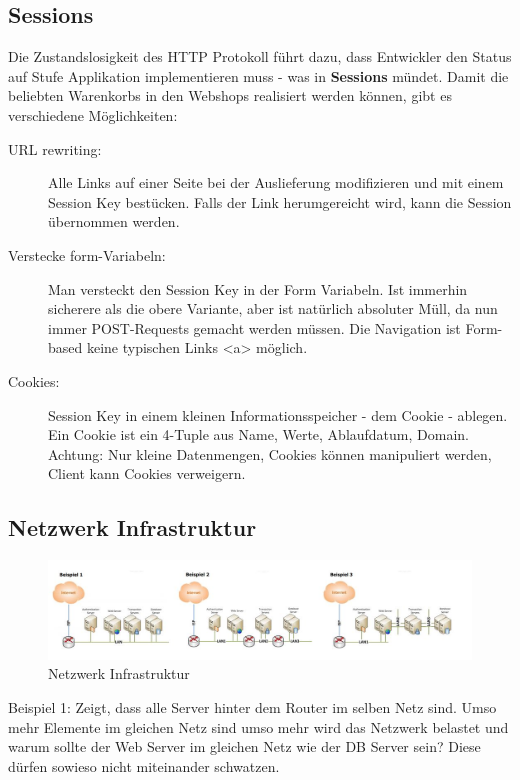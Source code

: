 \subsection{Sessions}
Die Zustandslosigkeit des HTTP Protokoll führt dazu, dass Entwickler den Status auf Stufe Applikation implementieren muss - was in \textbf{Sessions} mündet. Damit die beliebten Warenkorbs in den Webshops realisiert werden können, gibt es verschiedene Möglichkeiten:
\begin{description}
	\item[URL rewriting:] Alle Links auf einer Seite bei der Auslieferung modifizieren und mit einem Session Key bestücken. Falls der Link herumgereicht wird, kann die Session übernommen werden.
	\item[Verstecke form-Variabeln:] Man versteckt den Session Key in der Form Variabeln. Ist immerhin sicherere als die obere Variante, aber ist natürlich absoluter Müll, da nun immer POST-Requests gemacht werden müssen. Die Navigation ist Form-based keine typischen Links <a> möglich.
	\item[Cookies:] Session Key in einem kleinen Informationsspeicher - dem Cookie - ablegen. Ein Cookie ist ein 4-Tuple aus Name, Werte, Ablaufdatum, Domain. Achtung: Nur kleine Datenmengen, Cookies können manipuliert werden, Client kann Cookies verweigern.
\end{description}

\subsection{Netzwerk Infrastruktur}

\begin{figure}[h!]
	\centering
	\includegraphics[width=1\linewidth]{fig/cms-netzwerkinfrastruktur}
	\caption{Netzwerk Infrastruktur}
	\label{fig:cms-netzwerkinfrastruktur}
\end{figure}

Beispiel 1: Zeigt, dass alle Server hinter dem Router im selben Netz sind. Umso mehr Elemente im gleichen Netz sind umso mehr wird das Netzwerk belastet und warum sollte der Web Server im gleichen Netz wie der DB Server sein? Diese dürfen sowieso nicht miteinander schwatzen.

